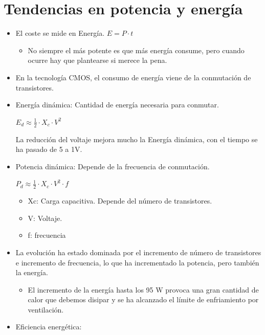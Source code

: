 \documentclass[12pt, twoside, openright]{report} %
\begin{document}
  \section{Tendencias en potencia y energía}

  \begin{itemize}
  
  \item
    El coste se mide en Energía. \(E= P \cdot t\)

    \begin{itemize}
    
    \item
      No siempre el más potente es que más energía consume, pero cuando
      ocurre hay que plantearse si merece la pena.
    \end{itemize}
  \item
    En la tecnología CMOS, el consumo de energía viene de la conmutación
    de transistores.
  \item
    Energía dinámica: Cantidad de energía necesaria para conmutar.

    
    
      \(E_d \approx \frac 1 2 \cdot X_c\cdot V^2\)

      La reducción del voltaje mejora mucho la Energía dinámica, con el
      tiempo se ha pasado de 5 a 1V.

    \item
    Potencia dinámica: Depende de la frecuencia de conmutación.

    
    
      \(P_d \approx \frac 1 2 \cdot X_c\cdot V^2\cdot f\)

    \begin{itemize}
      
      \item
        Xc: Carga capacitiva. Depende del número de transistores.
      \item
        V: Voltaje.
      \item
        f: frecuencia
      \end{itemize}
      \pagebreak
    \item
    La evolución ha estado dominada por el incremento de número de
    transistores e incremento de frecuencia, lo que ha incrementado la
    potencia, pero también la energía.

    \begin{itemize}
    
    \item
      El incremento de la energía hasta los 95 W provoca una gran
      cantidad de calor que debemos disipar y se ha alcanzado el límite
      de enfriamiento por ventilación.
    \end{itemize}
  \item
    Eficiencia energética:


\end{itemize}
\end{document}
